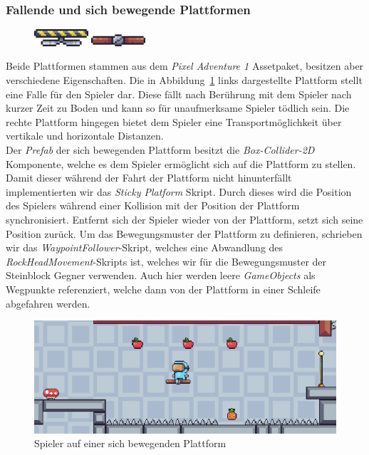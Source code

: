 \subsubsection*{Fallende und sich bewegende Plattformen}

\begin{figure}[H]
\includegraphics[width=20mm]{Figures/falling platform.png}
\quad
\includegraphics[width=20mm]{Figures/platform.png}
\label{fig:platforms}
\end{figure}

Beide Plattformen stammen aus dem \textit{Pixel Adventure 1} Assetpaket, besitzen aber verschiedene Eigenschaften. Die in Abbildung~\ref{fig:platforms} links dargestellte Plattform stellt eine Falle für den Spieler dar. Diese fällt nach Berührung mit dem Spieler nach kurzer Zeit zu Boden und kann so für unaufmerksame Spieler tödlich sein. Die rechte Plattform hingegen bietet dem Spieler eine Transportmöglichkeit über vertikale und horizontale Distanzen.\\

Der \textit{Prefab} der sich bewegenden Plattform besitzt die \textit{Box-Collider-2D} Komponente, welche es dem Spieler ermöglicht sich auf die Plattform zu stellen. Damit dieser während der Fahrt der Plattform nicht hinunterfällt implementierten wir das \textit{Sticky Platform} Skript. Durch dieses wird die Position des Spielers während einer Kollision mit der Position der Plattform synchronisiert. Entfernt sich der Spieler wieder von der Plattform, setzt sich seine Position zurück. Um das Bewegungsmuster der Plattform zu definieren, schrieben wir das \textit{WaypointFollower}-Skript, welches eine Abwandlung des \textit{RockHeadMovement}-Skripts ist, welches wir für die Bewegungsmuster der Steinblock Gegner verwenden. Auch hier werden leere \textit{GameObjects} als Wegpunkte referenziert, welche dann von der Plattform in einer Schleife abgefahren werden.\\

\begin{figure}[th]
\centering
\includegraphics[width=120mm]{Figures/platform-example.png}
\decoRule
\caption[Fahrt eines Spieler-Charakters auf einer Plattform]{Spieler auf einer sich bewegenden Plattform}
\label{fig:platform-example}
\end{figure}


